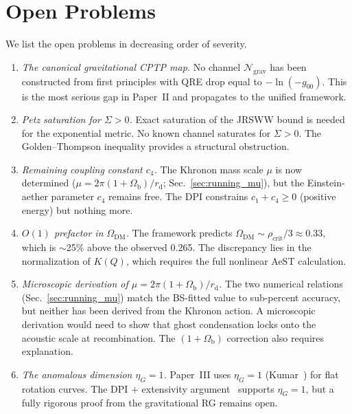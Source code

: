 \documentclass[prd,twocolumn,superscriptaddress,longbibliography,floatfix]{revtex4-2}
\newcommand{\chan}{\mathcal{N}}
\newcommand{\OmDM}{\Omega_{\mathrm{DM}}}
\begin{document}
\section{Open Problems}
\label{sec:open}

We list the open problems in decreasing order of
severity.

\begin{enumerate}
\item \emph{The canonical gravitational CPTP map.}
  No channel $\chan_{\mathrm{grav}}$ has been
  constructed from first principles with QRE drop
  equal to $-\ln(-g_{00})$.  This is the most serious
  gap in Paper~II and propagates to the unified
  framework.

\item \emph{Petz saturation for $\Sigma > 0$.}
  Exact saturation of the JRSWW bound is needed for
  the exponential metric.  No known channel saturates
  for $\Sigma > 0$.  The Golden--Thompson inequality
  provides a structural obstruction.

\item \emph{Remaining coupling constant $c_4$.}
  The Khronon mass scale $\mu$ is now determined
  ($\mu = 2\pi(1+\Omega_{\mathrm{b}})/r_{\mathrm{d}}$;
  Sec.~\ref{sec:running_mu}), but the Einstein-aether
  parameter $c_4$ remains free.  The DPI constrains
  $c_1 + c_4 \geq 0$ (positive energy) but nothing
  more.

\item \emph{$O(1)$ prefactor in $\OmDM$.}
  The framework predicts
  $\OmDM \sim \rho_{\mathrm{crit}}/3 \approx 0.33$,
  which is $\sim$25\% above the observed 0.265.  The
  discrepancy lies in the normalization of $K(Q)$,
  which requires the full nonlinear AeST calculation.

\item \emph{Microscopic derivation of
  $\mu = 2\pi(1+\Omega_{\mathrm{b}})/r_{\mathrm{d}}$.}
  The two numerical relations
  (Sec.~\ref{sec:running_mu}) match the BS-fitted
  value to sub-percent accuracy, but neither has been
  derived from the Khronon action.
  A microscopic derivation would need to show that
  ghost condensation locks onto the acoustic scale
  at recombination.  The $(1+\Omega_{\mathrm{b}})$
  correction also requires explanation.

\item \emph{The anomalous dimension $\eta_G = 1$.}
  Paper~III uses $\eta_G = 1$ (Kumar~\cite{Kumar2025})
  for flat rotation curves.  The DPI $+$ extensivity
  argument~\cite{Paper3} supports $\eta_G = 1$, but
  a fully rigorous proof from the gravitational RG
  remains open.


\end{enumerate}
\end{document}
